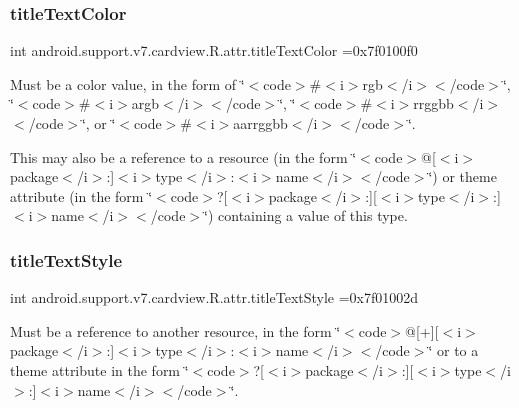 \subsubsection{\texorpdfstring{title\+Text\+Color}{titleTextColor}}
{\footnotesize\ttfamily int android.\+support.\+v7.\+cardview.\+R.\+attr.\+title\+Text\+Color =0x7f0100f0\hspace{0.3cm}{\ttfamily [static]}}

Must be a color value, in the form of \char`\"{}$<$code$>$\#$<$i$>$rgb$<$/i$>$$<$/code$>$\char`\"{}, \char`\"{}$<$code$>$\#$<$i$>$argb$<$/i$>$$<$/code$>$\char`\"{}, \char`\"{}$<$code$>$\#$<$i$>$rrggbb$<$/i$>$$<$/code$>$\char`\"{}, or \char`\"{}$<$code$>$\#$<$i$>$aarrggbb$<$/i$>$$<$/code$>$\char`\"{}. 

This may also be a reference to a resource (in the form \char`\"{}$<$code$>$@\mbox{[}$<$i$>$package$<$/i$>$\+:\mbox{]}$<$i$>$type$<$/i$>$\+:$<$i$>$name$<$/i$>$$<$/code$>$\char`\"{}) or theme attribute (in the form \char`\"{}$<$code$>$?\mbox{[}$<$i$>$package$<$/i$>$\+:\mbox{]}\mbox{[}$<$i$>$type$<$/i$>$\+:\mbox{]}$<$i$>$name$<$/i$>$$<$/code$>$\char`\"{}) containing a value of this type. \mbox{\label{classandroid_1_1support_1_1v7_1_1cardview_1_1R_1_1attr_a51262633643c8f1e23f18798bc06f662}} 
\subsubsection{\texorpdfstring{title\+Text\+Style}{titleTextStyle}}
{\footnotesize\ttfamily int android.\+support.\+v7.\+cardview.\+R.\+attr.\+title\+Text\+Style =0x7f01002d\hspace{0.3cm}{\ttfamily [static]}}

Must be a reference to another resource, in the form \char`\"{}$<$code$>$@\mbox{[}+\mbox{]}\mbox{[}$<$i$>$package$<$/i$>$\+:\mbox{]}$<$i$>$type$<$/i$>$\+:$<$i$>$name$<$/i$>$$<$/code$>$\char`\"{} or to a theme attribute in the form \char`\"{}$<$code$>$?\mbox{[}$<$i$>$package$<$/i$>$\+:\mbox{]}\mbox{[}$<$i$>$type$<$/i$>$\+:\mbox{]}$<$i$>$name$<$/i$>$$<$/code$>$\char`\"{}. \mbox{\label{classandroid_1_1support_1_1v7_1_1cardview_1_1R_1_1attr_a602ae2bf742a9f0969aa808023ae9582}} 
